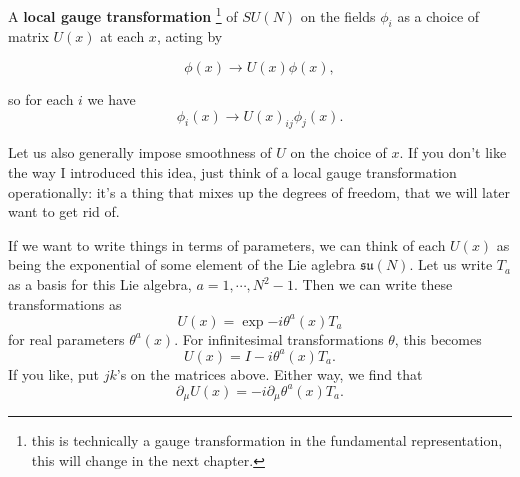 \documentclass[main.tex]{subfiles}
\begin{document}
\begin{defn}
A \textbf{local gauge transformation} \footnote{this is technically a gauge transformation in the fundamental representation, this will change in the next chapter.} of $SU(N)$ on the fields $\phi_i$ as a choice of matrix $U(x)$ at each $x$, acting by

\begin{equation} \label{localgaugetrans}
 \boxed{\phi (x) \to U(x) \phi(x),}
\end{equation}

so for each $i$ we have
\[
\phi_i(x) \to U(x)_{ij} \phi_j (x).
\]
\end{defn}
Let us also generally impose smoothness of $U$ on the choice of $x$. If you don't like the way I introduced this idea, just think of a local gauge transformation operationally: it's a thing that mixes up the degrees of freedom, that we will later want to get rid of.

If we want to write things in terms of parameters, we can think of each $U(x)$ as being the exponential of some element of the Lie aglebra $\mathfrak{su} (N)$. Let us write $T_a$ as a basis for this Lie algebra, $a = 1,\cdots, N^2 -1$. Then we can write these transformations as
\[
U(x) = \exp{- i \theta^a (x) T_a}
\]
for real parameters $\theta^a (x)$. For infinitesimal transformations $\theta$, this becomes
\[
U(x) = I - i \theta^a (x) T_a.
\]
If you like, put $jk$'s on the matrices above. Either way, we find that 
\[
\partial_\mu U (x) = -i \partial_\mu \theta^a (x) T_a.
\]
\end{document}
